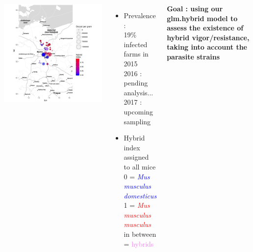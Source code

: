 \documentclass[30pt, a0paper, portrait, margin=0mm, innermargin=15mm,
               blockverticalspace=15mm, colspace=15mm, subcolspace=8mm]{tikzposter}
\begin{document}
\begin{columns}
{\vfill
\begin{minipage}{0.3\linewidth}
    \includegraphics[width=2\linewidth]{Map2015-2016_temp.pdf}
\end{minipage}
\hspace{11cm}
\begin{minipage}{0.4\linewidth}
 \begin{itemize}
      \item{Prevalence : \\19\% infected farms in 2015\\ 2016 : pending analysis... \\ 2017 : upcoming sampling}\\
       \item{Hybrid index assigned to all mice \\0 = \textit{\textcolor{blue}{Mus musculus domesticus}}\\
       1 = \textit{\textcolor{red}{Mus musculus musculus}}\\
       in between = \textcolor{violet}{hybrids}}
 \end{itemize}
\end{minipage}

\textbf{Goal : using our glm.hybrid model to assess the existence of hybrid vigor/resistance, taking into account the parasite strains}
}


\end{columns}
\end{document}
